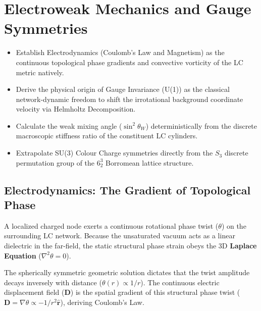 \chapter{Electroweak Mechanics and Gauge Symmetries}
\label{ch:electroweak}

\begin{objectivebox}
\begin{itemize}
    \item Establish Electrodynamics (Coulomb's Law and Magnetism) as the continuous topological phase gradients and convective vorticity of the LC metric natively.
    \item Derive the physical origin of Gauge Invariance (U(1)) as the classical network-dynamic freedom to shift the irrotational background coordinate velocity via Helmholtz Decomposition.
    \item Calculate the weak mixing angle ($\sin^2\theta_W$) deterministically from the discrete macroscopic stiffness ratio of the constituent LC cylinders.
    \item Extrapolate SU(3) Colour Charge symmetries directly from the $S_3$ discrete permutation group of the $6^3_2$ Borromean lattice structure.
\end{itemize}
\end{objectivebox}

\section{Electrodynamics: The Gradient of Topological Phase}
A localized charged node exerts a continuous rotational phase twist ($\theta$) on the surrounding LC network. Because the unsaturated vacuum acts as a linear dielectric in the far-field, the static structural phase strain obeys the 3D \textbf{Laplace Equation} ($\nabla^2 \theta = 0$).

The spherically symmetric geometric solution dictates that the twist amplitude decays inversely with distance ($\theta(r) \propto 1/r$). The continuous electric displacement field ($\mathbf{D}$) is the spatial gradient of this structural phase twist ($\mathbf{D} = \nabla\theta \propto -1/r^2 \mathbf{\hat{r}}$), deriving Coulomb's Law.

